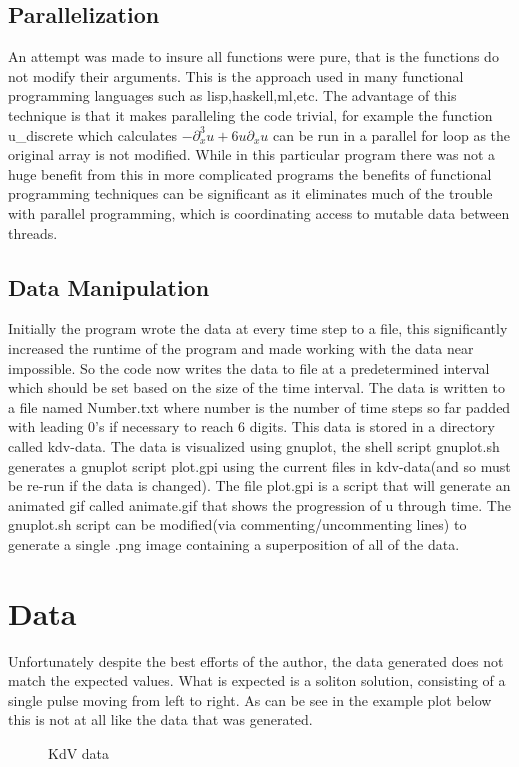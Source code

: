 \documentclass{article}
\begin{document}
{\subsection{Parallelization}
An attempt was made to insure all functions were pure, that is the
functions do not modify their arguments. This is the approach used in many
functional programming languages such as lisp,haskell,ml,etc. The advantage of
this technique is that it makes paralleling the code trivial, for example the
function u_discrete which calculates \(-\partial_x^3u+6u\partial_xu\) can be
run in a parallel for loop as the original array is not modified. While in this
particular program there was not a huge benefit from this in more complicated
programs the benefits of functional programming techniques can be significant
as it eliminates much of the trouble with parallel programming, which is
coordinating access to mutable data between threads.
\subsection{Data Manipulation}
Initially the program wrote the data at every time step to a file, this
significantly increased the runtime of the program and made working with the
data near impossible. So the code now writes the data to file at a
predetermined interval which should be set based on the size of the time
interval. The data is written to a file named {Number}.txt where number is the
number of time steps so far padded with leading 0's if necessary to reach 6
digits. This data is stored in a directory called kdv-data. The data is
visualized using gnuplot, the shell script gnuplot.sh generates a gnuplot
script plot.gpi using the current files in kdv-data(and so must be re-run if
the data is changed). The file plot.gpi is a script that will generate an
animated gif called animate.gif that shows the progression of u through time.
The gnuplot.sh script can be modified(via commenting/uncommenting lines) to
generate a single .png image containing a superposition of all of the data.
\section{Data}
Unfortunately despite the best efforts of the author, the data generated does
not match the expected values. What is expected is a soliton solution,
consisting of a single pulse moving from left to right. As can be see in the
example plot below this is not at all like the data that was generated.
\begin{figure}
  \centering
  \caption{KdV data}
\end{figure}
}
\end{document}
